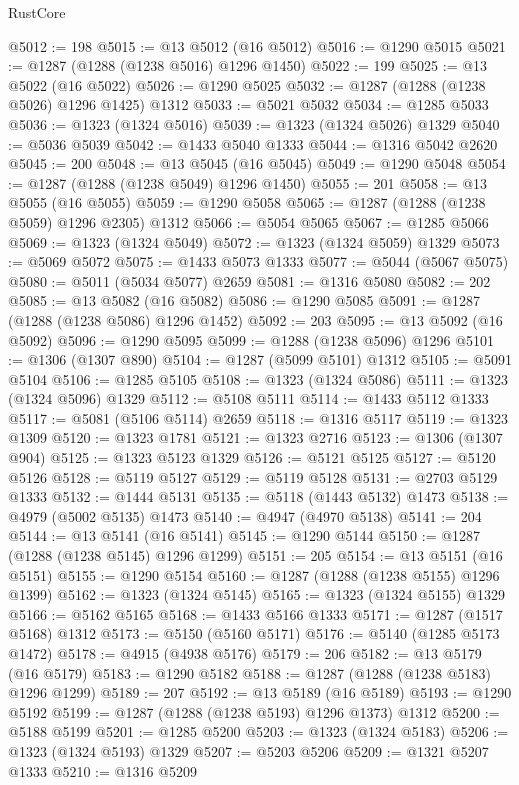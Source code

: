 \begin{lexlean}{RustCore}
\begin{coremodule}
@5012 := 198
@5015 := @13 @5012 (@16 @5012)
@5016 := @1290 @5015
@5021 := @1287 (@1288 (@1238 @5016) @1296 @1450)
@5022 := 199
@5025 := @13 @5022 (@16 @5022)
@5026 := @1290 @5025
@5032 := @1287 (@1288 (@1238 @5026) @1296 @1425) @1312
@5033 := @5021 @5032
@5034 := @1285 @5033
@5036 := @1323 (@1324 @5016)
@5039 := @1323 (@1324 @5026) @1329
@5040 := @5036 @5039
@5042 := @1433 @5040 @1333
@5044 := @1316 @5042 @2620
@5045 := 200
@5048 := @13 @5045 (@16 @5045)
@5049 := @1290 @5048
@5054 := @1287 (@1288 (@1238 @5049) @1296 @1450)
@5055 := 201
@5058 := @13 @5055 (@16 @5055)
@5059 := @1290 @5058
@5065 := @1287 (@1288 (@1238 @5059) @1296 @2305) @1312
@5066 := @5054 @5065
@5067 := @1285 @5066
@5069 := @1323 (@1324 @5049)
@5072 := @1323 (@1324 @5059) @1329
@5073 := @5069 @5072
@5075 := @1433 @5073 @1333
@5077 := @5044 (@5067 @5075)
@5080 := @5011 (@5034 @5077) @2659
@5081 := @1316 @5080
@5082 := 202
@5085 := @13 @5082 (@16 @5082)
@5086 := @1290 @5085
@5091 := @1287 (@1288 (@1238 @5086) @1296 @1452)
@5092 := 203
@5095 := @13 @5092 (@16 @5092)
@5096 := @1290 @5095
@5099 := @1288 (@1238 @5096) @1296
@5101 := @1306 (@1307 @890)
@5104 := @1287 (@5099 @5101) @1312
@5105 := @5091 @5104
@5106 := @1285 @5105
@5108 := @1323 (@1324 @5086)
@5111 := @1323 (@1324 @5096) @1329
@5112 := @5108 @5111
@5114 := @1433 @5112 @1333
@5117 := @5081 (@5106 @5114) @2659
@5118 := @1316 @5117
@5119 := @1323 @1309
@5120 := @1323 @1781
@5121 := @1323 @2716
@5123 := @1306 (@1307 @904)
@5125 := @1323 @5123 @1329
@5126 := @5121 @5125
@5127 := @5120 @5126
@5128 := @5119 @5127
@5129 := @5119 @5128
@5131 := @2703 @5129 @1333
@5132 := @1444 @5131
@5135 := @5118 (@1443 @5132) @1473
@5138 := @4979 (@5002 @5135) @1473
@5140 := @4947 (@4970 @5138)
@5141 := 204
@5144 := @13 @5141 (@16 @5141)
@5145 := @1290 @5144
@5150 := @1287 (@1288 (@1238 @5145) @1296 @1299)
@5151 := 205
@5154 := @13 @5151 (@16 @5151)
@5155 := @1290 @5154
@5160 := @1287 (@1288 (@1238 @5155) @1296 @1399)
@5162 := @1323 (@1324 @5145)
@5165 := @1323 (@1324 @5155) @1329
@5166 := @5162 @5165
@5168 := @1433 @5166 @1333
@5171 := @1287 (@1517 @5168) @1312
@5173 := @5150 (@5160 @5171)
@5176 := @5140 (@1285 @5173 @1472)
@5178 := @4915 (@4938 @5176)
@5179 := 206
@5182 := @13 @5179 (@16 @5179)
@5183 := @1290 @5182
@5188 := @1287 (@1288 (@1238 @5183) @1296 @1299)
@5189 := 207
@5192 := @13 @5189 (@16 @5189)
@5193 := @1290 @5192
@5199 := @1287 (@1288 (@1238 @5193) @1296 @1373) @1312
@5200 := @5188 @5199
@5201 := @1285 @5200
@5203 := @1323 (@1324 @5183)
@5206 := @1323 (@1324 @5193) @1329
@5207 := @5203 @5206
@5209 := @1321 @5207 @1333
@5210 := @1316 @5209

\end{coremodule}
\end{lexlean}
